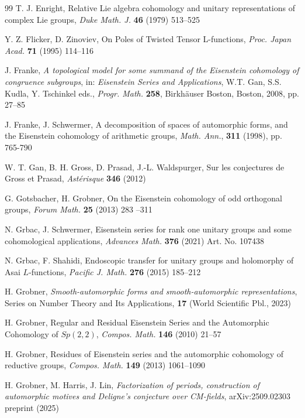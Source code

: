 \begin{thebibliography}{99}
 T. J. Enright, Relative Lie algebra cohomology and unitary representations of complex Lie groups, {\it Duke Math. J.} {\bf 46} (1979) 513--525

 Y. Z. Flicker, D. Zinoviev, On Poles of Twisted Tensor L-functions, {\it Proc. Japan Acad.} {\bf 71} (1995) 114--116

 J. Franke, {\it A topological model for some summand of the Eisenstein cohomology of congruence subgroups}, in: {\it Eisenstein Series and Applications}, W.T. Gan, S.S. Kudla, Y. Tschinkel eds., {\it Progr. Math.} {\bf 258}, Birkh\"{a}user Boston, Boston, 2008, pp. 27--85


 J. Franke, J. Schwermer, A decomposition of spaces of automorphic forms, and the Eisenstein cohomology of arithmetic groups, {\it Math. Ann.}, \textbf{311} (1998), pp. 765-790


 W. T. Gan, B. H. Gross, D. Prasad, J.-L. Waldspurger, Sur les conjectures de Gross et Prasad, {\it Ast\'erisque} {\bf 346} (2012)


 G. Gotsbacher, H. Grobner, On the Eisenstein cohomology of odd orthogonal groups, {\it Forum Math.} {\bf 25} (2013) 283 --311

 N. Grbac, J. Schwermer, Eisenstein series for rank one unitary groups and some cohomological applications, {\it Advances Math.} {\bf 376} (2021) Art. No. 107438

 N. Grbac, F. Shahidi, Endoscopic transfer for unitary groups and holomorphy of Asai $L$-functions, {\it Pacific J. Math.} {\bf 276} (2015) 185--212 


 H. Grobner, {\it Smooth-automorphic forms and smooth-automorphic representations}, Series on Number Theory and Its Applications, {\bf 17} (World Scientific Pbl., 2023)


 H. Grobner, Regular and Residual Eisenstein Series and the Automorphic Cohomology of $Sp(2,2)$, {\it Compos. Math.} {\bf 146} (2010) 21--57

 H. Grobner, Residues of Eisenstein series and the automorphic cohomology of reductive groups, {\it Compos. Math.} {\bf 149} (2013) 1061--1090


 H. Grobner, M. Harris, J. Lin, {\it Factorization of periods, construction of automorphic motives and Deligne's conjecture over CM-fields},  	arXiv:2509.02303 preprint (2025)



\end{thebibliography}
